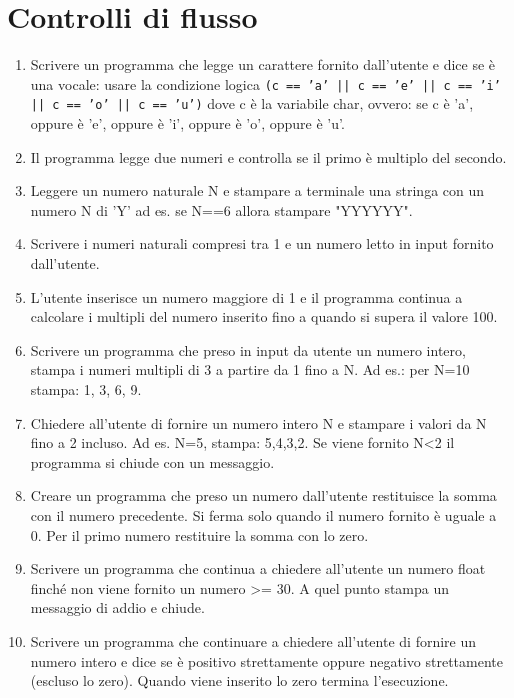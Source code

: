 \documentclass{article}
\begin{document}
\section{Controlli di flusso}
\begin{enumerate}

\item Scrivere un programma che legge un carattere fornito dall'utente e dice se è una vocale: usare la condizione logica \texttt{(c == 'a' || c == 'e' || c == 'i' || c == 'o' || c == 'u')} dove c è la variabile char, ovvero: se c è 'a', oppure è 'e', oppure è 'i', oppure è 'o', oppure è 'u'.

\item Il programma legge due numeri e controlla se il primo è multiplo del secondo.

\item Leggere un numero naturale N e stampare a terminale una stringa con un numero N di 'Y’ ad es. se N==6 allora stampare "YYYYYY".

\item Scrivere i numeri naturali compresi tra 1 e un numero letto in input fornito dall'utente.

\item L’utente inserisce un numero maggiore di 1 e il programma continua a calcolare i multipli del numero inserito fino a quando si supera il valore 100.

\item Scrivere un programma che preso in input da utente un numero intero, stampa i numeri multipli di 3 a partire da 1 fino a N. Ad es.: per N=10 stampa: 1, 3, 6, 9.

\item Chiedere all’utente di fornire un numero intero N e stampare i valori da N fino a 2 incluso. Ad es. N=5, stampa: 5,4,3,2. Se viene fornito N<2 il programma si chiude con un messaggio.

\item Creare un programma che preso un numero dall'utente restituisce la somma con il numero precedente. Si ferma solo quando il numero fornito è uguale a 0. Per il primo numero restituire la somma con lo zero. 

\item Scrivere un programma che continua a chiedere all'utente un numero float finché non viene fornito un numero >= 30. A quel punto stampa un messaggio di addio e chiude.

\item Scrivere un programma che continuare a chiedere all'utente di fornire un numero intero e dice se è positivo strettamente oppure negativo strettamente (escluso lo zero). Quando viene inserito lo zero termina l'esecuzione.


\end{enumerate}
\end{document}
